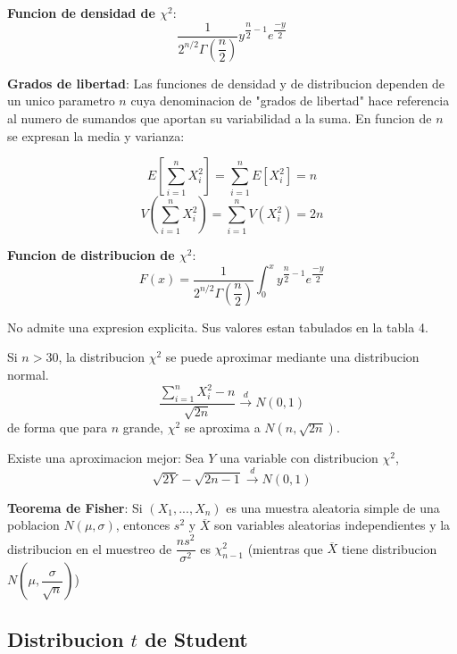 \documentclass[10pt]{extarticle}
\newcommand{\<}{\langle}
\renewcommand{\>}{\rangle}
\theoremstyle{definition}
\begin{document}
\textbf{Funcion de densidad de $\chi^2$}:
\begin{equation*}
  \dfrac{1}{2^{n/2}\Gamma(\dfrac{n}{2})}y^{\dfrac{n}{2}-1}e^{\dfrac{-y}{2}}
\end{equation*}

\textbf{Grados de libertad}: Las funciones de densidad y de distribucion dependen de un unico parametro $n$ cuya denominacion de "grados de libertad" hace referencia al numero de sumandos que aportan su variabilidad a la suma. En funcion de $n$ se expresan la media y varianza:

\begin{equation*}
  E[\sum_{i=1}^n X_i^2]=\sum_{i=1}^n E[X_i^2]=n
\end{equation*}
\begin{equation*}
  V(\sum_{i=1}^n X_i^2)=\sum_{i=1}^n V(X_i^2)=2n
\end{equation*}

\textbf{Funcion de distribucion de $\chi^2$}:
\begin{equation*}
  F(x)=\dfrac{1}{2^{n/2}\Gamma(\dfrac{n}{2})}\int_0^x y^{\dfrac{n}{2}-1}e^{\dfrac{-y}{2}}
\end{equation*}

No admite una expresion explicita. Sus valores estan tabulados en la tabla 4.

Si $n>30$, la distribucion $\chi^2$ se puede aproximar mediante una distribucion normal.
\begin{equation*}
  \dfrac{\sum_{i=1}^n X_i^2 - n}{\sqrt{2n}}\xrightarrow{d} N(0,1)
\end{equation*}
de forma que para $n$ grande, $\chi^2$ se aproxima a $N(n, \sqrt{2n})$.

Existe una aproximacion mejor: Sea $Y$ una variable con distribucion $\chi^2$,
\begin{equation*}
  \sqrt{2Y} - \sqrt{2n-1} \xrightarrow{d} N(0,1)
\end{equation*}

\textbf{Teorema de Fisher}: Si $(X_1, ..., X_n)$ es una muestra aleatoria simple de una poblacion $N(\mu, \sigma)$, entonces $s^2$ y $\overline{X}$ son variables aleatorias independientes y la distribucion en el muestreo de $\dfrac{ns^2}{\sigma^2}$ es $\chi_{n-1}^2$ (mientras que $\overline{X}$ tiene distribucion $N(\mu, \dfrac{\sigma}{\sqrt{n}})$)

\subsection*{Distribucion $t$ de Student}
\end{document}

